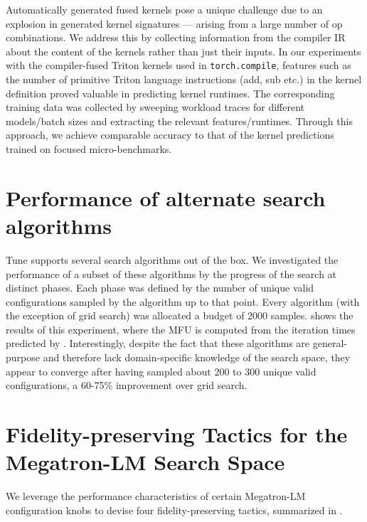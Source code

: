 Automatically generated fused kernels pose a unique challenge due to an explosion in generated kernel signatures --- arising from a large number of op combinations. We address this by collecting information from the compiler IR about the content of the kernels rather than just their inputs. In our experiments with the compiler-fused Triton kernels used in \texttt{torch.compile}, features such as the number of primitive Triton language instructions (add, sub etc.) in the kernel definition proved valuable in predicting kernel runtimes. The corresponding training data was collected by sweeping workload traces for different models/batch sizes and extracting the relevant features/runtimes. Through this approach, we achieve comparable accuracy to that of the kernel predictions trained on focused micro-benchmarks. 

\vspace{1em}





\section{Performance of alternate search algorithms}

Tune supports several search algorithms out of the box. We investigated the performance of a subset of these algorithms by the progress of the search at distinct phases. Each phase was defined by the number of unique valid configurations sampled by the algorithm up to that point. Every algorithm (with the exception of grid search) was allocated a budget of 2000 samples.  shows the results of this experiment, where the MFU is computed from the iteration times predicted by \sysname. Interestingly, despite the fact that these algorithms are general-purpose and therefore lack domain-specific knowledge of the search space, they appear to converge after having sampled about 200 to 300 unique valid configurations, a 60-75\% improvement over grid search.

\section{Fidelity-preserving Tactics for the Megatron-LM Search Space}
\label{appendix:tactics}

We leverage the performance characteristics of certain Megatron-LM configuration knobs to devise four fidelity-preserving tactics, summarized in .



